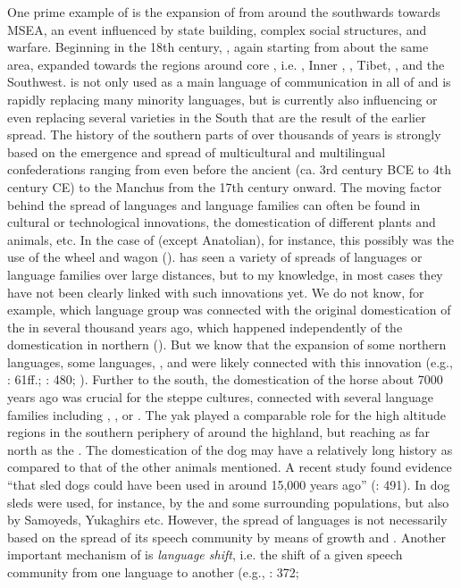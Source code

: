 \largerpage
\noindent One prime example of  is the expansion of  from around the  southwards towards MSEA, an event influenced by state building, complex social structures, and warfare. Beginning in the 18th century, , again starting from about the same area, expanded towards the regions around core , i.e. , Inner , , Tibet, , and the Southwest.  is not only used as a main language of communication in all of  and is rapidly replacing many minority languages, but is currently also influencing or even replacing several  varieties in the South that are the result of the earlier spread. The history of the southern parts of  over thousands of years is strongly based on the emergence and spread of multicultural and multilingual confederations ranging from even before the ancient  (ca. 3rd century BCE to 4th century CE) to the Manchus from the 17th century onward. The moving factor behind the spread of languages and language families can often be found in cultural or technological innovations, the domestication of different plants and animals, etc. In the case of  (except Anatolian), for instance, this possibly was the use of the wheel and wagon (\citealt{AnthonyRinge2015}).  has seen a variety of spreads of languages or language families over large distances, but to my knowledge, in most cases they have not been clearly linked with such innovations yet. We do not know, for example, which language group was connected with the original domestication of the  in  several thousand years ago, which happened independently of the domestication in northern  (\citealt{Røed2008}). But we know that the expansion of some northern  languages, some  languages, , and  were likely connected with this innovation (e.g., \citealt{Janhunen1996}: 61ff.; \citealt{Helimski1998}: 480; \citealt{Anderson2006c,Anderson2006e}). Further to the south, the domestication of the horse about 7000 years ago was crucial for the steppe cultures, connected with several language families including , , or  \citep{Anthony2007}. The yak played a comparable role for the high altitude regions in the southern periphery of  around the  highland, but reaching as far north as the  \citep{Wiener2013}. The domestication of the dog may have a relatively long history as compared to that of the other animals mentioned. A recent study found evidence “that sled dogs could have been used in  around 15,000 years ago” (\citealt{PitulkoKasparov2017}: 491). In  dog sleds were used, for instance, by the  and some surrounding  populations, but also by Samoyeds, Yukaghirs etc. However, the spread of languages is not necessarily based on the spread of its speech community by means of growth and . Another important mechanism of  is \textit{language shift}, i.e. the shift of a given speech community from one language to another (e.g., \citealt{Nichols1997}: 372; 